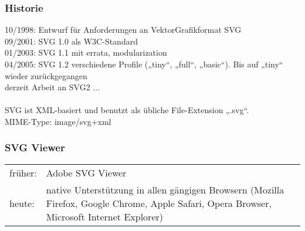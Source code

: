 \subsubsection{Historie}
10/1998: Entwurf für Anforderungen an VektorGrafikformat SVG\\
09/2001: SVG 1.0 als W3C-Standard\\
01/2003: SVG 1.1 mit errata, modularization\\
04/2005: SVG 1.2 verschiedene Profile („tiny“, „full“, „basic“). Bis auf „tiny“ wieder zurückgegangen\\
derzeit Arbeit an SVG2 ...\\
\\
SVG ist XML-basiert und benutzt als übliche File-Extension „.svg“.\\
MIME-Type: image/svg+xml\\

\subsubsection{SVG Viewer}
\begin{tabularx}{\textwidth}{lX}
früher: & Adobe SVG Viewer\\
heute: & native Unterstützung in allen gängigen Browsern (Mozilla Firefox, Google Chrome, Apple Safari, Opera Browser, Microsoft Internet Explorer)
\end{tabularx}

